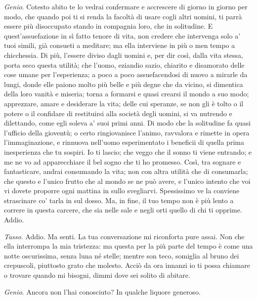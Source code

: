 \emph{Genio}. Cotesto abito te lo vedrai confermare e accrescere di giorno in giorno per modo, che quando poi ti si renda la facoltà di usare cogli altri uomini, ti parrà essere più disoccupato stando in compagnia loro, che in solitudine. E quest'assuefazione in sì fatto tenore di vita, non credere che intervenga solo a' tuoi simili, già consueti a meditare; ma ella interviene in più o men tempo a chicchessia. Di più, l'essere diviso dagli uomini e, per dir così, dalla vita stessa, porta seco questa utilità; che l'uomo, eziandio sazio, chiarito e disamorato delle cose umane per l'esperienza; a poco a poco assuefacendosi di nuovo a mirarle da lungi, donde elle paiono molto più belle e più degne che da vicino, si dimentica della loro vanità e miseria; torna a formarsi e quasi crearsi il mondo a suo modo; apprezzare, amare e desiderare la vita; delle cui speranze, se non gli è tolto o il potere o il confidare di restituirsi alla società degli uomini, si va nutrendo e dilettando, come egli soleva a' suoi primi anni. Di modo che la solitudine fa quasi l'ufficio della gioventù; o certo ringiovanisce l'animo, ravvalora e rimette in opera l'immaginazione, e rinnuova nell'uomo esperimentato i beneficii di quella prima inesperienza che tu sospiri. Io ti lascio; che veggo che il sonno ti viene entrando; e me ne vo ad apparecchiare il bel sogno che ti ho promesso. Così, tra sognare e fantasticare, andrai consumando la vita; non con altra utilità che di consumarla; che questo e l'unico frutto che al mondo se ne può avere, e l'unico intento che voi vi dovete proporre ogni mattina in sullo svegliarvi. Spessissimo ve la conviene strascinare co' tarla in sul dosso. Ma, in fine, il tuo tempo non è più lento a correre in questa carcere, che sia nelle sale e negli orti quello di chi ti opprime. Addio.

\emph{Tasso}. Addio. Ma senti. La tua conversazione mi riconforta pure assai. Non che ella interrompa la mia tristezza: ma questa per la più parte del tempo è come una notte oscurissima, senza luna né stelle; mentre son teco, somiglia al bruno dei crepuscoli, piuttosto grato che molesto. Acciò da ora innanzi io ti possa chiamare o trovare quando mi bisogni, dimmi dove sei solito di abitare.

\emph{Genio}. Ancora non l'hai conosciuto? In qualche liquore generoso.



